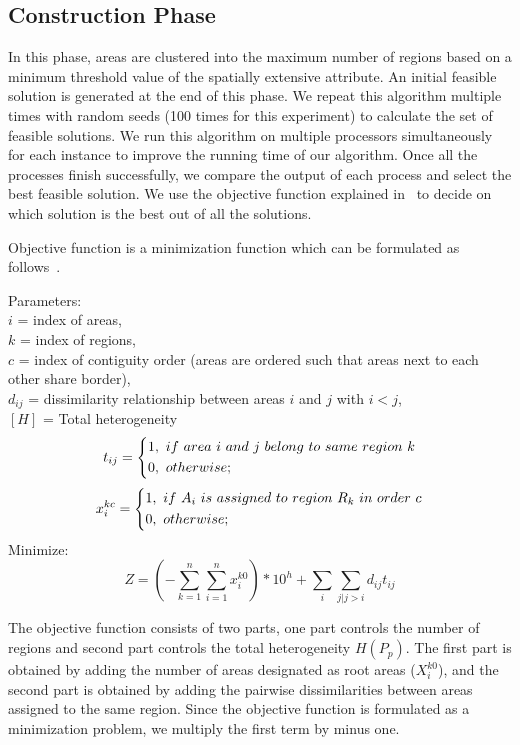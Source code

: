 \documentclass[conference]{IEEEtran}
\begin{document}
\subsection{Construction Phase}
In this phase, areas are clustered into the maximum number of regions based on
a minimum threshold value of the spatially extensive attribute. An initial feasible
solution is generated at the end of this phase. We repeat this algorithm
multiple times with random seeds (100 times for this experiment) to calculate the set of feasible
solutions. We run this algorithm on multiple processors simultaneously for each
instance to improve the running time of our algorithm. Once all the processes
finish successfully, we compare the output of each process and select the best
feasible solution. We use the objective function explained in~\cite{r1} to
decide on which solution is the best out of all the solutions.

Objective function is a minimization function which can be formulated as follows~\cite{r1}.

Parameters:\\
$i$ = index of areas,\\
$k$ = index of regions,\\
$c$ = index of contiguity order (areas are ordered such that areas next to each other share border),\\
$d_{ij}$ = dissimilarity relationship between areas $i$ and $j$ with $i < j$,\\
$[H]$ = Total heterogeneity\\
\begin{equation*}[H]
t_{ij} = \begin{dcases*}
        1,\ if\ area\ i\ and\ j\ belong\ to\ same\ region\ k\\
        0,\ otherwise;
        \end{dcases*}
\end{equation*}
\begin{equation*}[H]
x_i^{kc} = \begin{dcases*}
        1,\ if\ A_i\ is\ assigned\ to\ region\ R_k\ in\ order\ c\\
        0,\ otherwise;
        \end{dcases*}
\end{equation*}
Minimize:
\begin{equation*}[H]
Z = (-\sum_{k=1}^n \sum_{i=1}^n x_i^{k0}) *10^h + \sum_{i} \sum_{j|j>i} d_{ij} t_{ij}
\end{equation*}

The objective function consists of two parts, one part controls the number of regions and second part controls the total heterogeneity $H(P_p)$. The first part is obtained by adding the number of areas designated as root areas ($X_i^{k0}$), and the second part is obtained by adding the pairwise dissimilarities between areas assigned to the same region. Since the objective function is formulated as a minimization problem, we multiply the first term by minus one.
\end{document}
